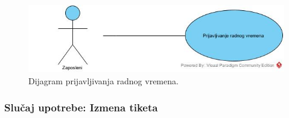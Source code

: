\documentclass[a4paper]{article}
\begin{document}
\begin{figure} [!ht]
    \begin{center}
        \includegraphics[scale=0.5]{Korisnici/Zaposleni/UML/PrijavljivanjeRadnogVremena.jpg}
    \end{center}
\caption{Dijagram prijavljivanja radnog vremena.}
\end{figure}

\subsubsection{Slučaj upotrebe: Izmena tiketa}
\end{document}
